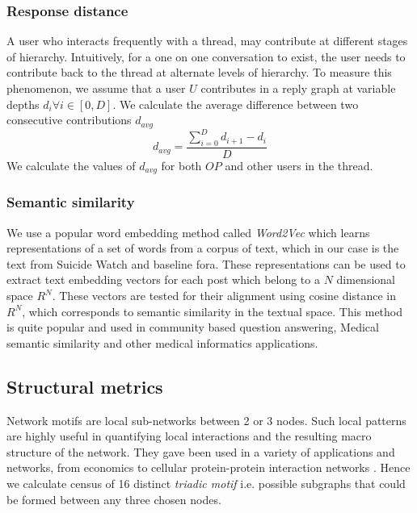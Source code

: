 \subsubsection{Response distance}
A user who interacts frequently with a thread, may contribute at different stages of hierarchy. Intuitively, for a one on one conversation to exist, the user needs to contribute back to the thread at alternate levels of hierarchy. To measure this phenomenon, we assume that a user $U$ contributes in a reply graph at variable depths $d_i \forall i \in [0,D]$. 
We calculate the average difference between two consecutive contributions $d_{avg}$
$$ d_{avg} = \frac{\sum_{i=0}^{D} d_{i+1} - d_i }{D}$$
We calculate the values of $d_{avg}$ for both $OP$ and other users in the thread.


\subsubsection{Semantic similarity}
\label{Sec:Semantic}
We use a popular word embedding method called \textit{Word2Vec} \cite{mikolov2013distributed} which learns representations of a set of words from a corpus of text, which in our case is the text from Suicide Watch and baseline fora. These representations can be used to extract text embedding vectors for each post which belong to a $N$ dimensional space $R^N$. These vectors are tested for their alignment using cosine distance in $R^N$, which corresponds to semantic similarity in the textual space. This method is quite popular and used in community based question answering\cite{mihaylov2016semanticz}, Medical semantic similarity \cite{de2014medical} and other medical informatics applications\cite{zhu2017semantic}.



\subsection{Structural metrics}
\label{Sec:motif}
Network motifs are local sub-networks between 2 or 3 nodes. Such local patterns are highly useful in quantifying local interactions and the resulting macro structure of the network\cite{milo2002network}. They gave been used in a variety of applications and networks, from economics \cite{zhang2014dynamic} to cellular protein-protein interaction networks \cite{yeger2004network}. Hence we calculate census of 16 distinct \textsl{triadic motif} i.e. possible subgraphs that could be formed between any three chosen nodes. 


